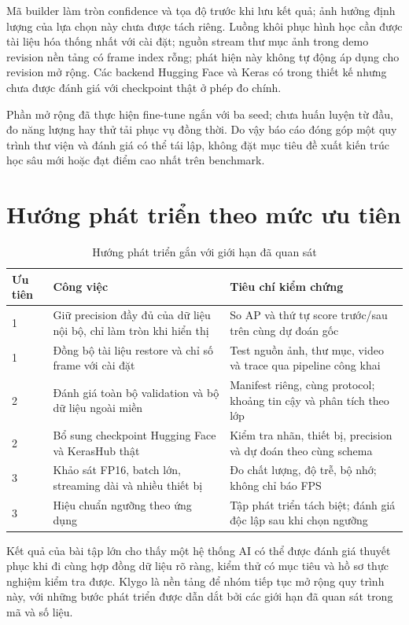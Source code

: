 Mã builder làm tròn confidence và tọa độ trước khi lưu kết quả; ảnh hưởng định lượng của lựa chọn này chưa được tách riêng. Luồng khôi phục hình học cần được tài liệu hóa thống nhất với cài đặt; nguồn stream thư mục ảnh trong demo revision nền tảng có frame index rỗng; phát hiện này không tự động áp dụng cho revision mở rộng. Các backend Hugging Face và Keras có trong thiết kế nhưng chưa được đánh giá với checkpoint thật ở phép đo chính.

Phần mở rộng đã thực hiện fine-tune ngắn với ba seed; chưa huấn luyện từ đầu, đo năng lượng hay thử tải phục vụ đồng thời. Do vậy báo cáo đóng góp một quy trình thư viện và đánh giá có thể tái lập, không đặt mục tiêu đề xuất kiến trúc học sâu mới hoặc đạt điểm cao nhất trên benchmark.

\section{Hướng phát triển theo mức ưu tiên}
\begin{table}[H]\centering\small
\caption{Hướng phát triển gắn với giới hạn đã quan sát}
\begin{tabularx}{\textwidth}{p{1.2cm}YY}
\toprule Ưu tiên & Công việc & Tiêu chí kiểm chứng \\ & Giữ precision đầy đủ của dữ liệu nội bộ, chỉ làm tròn khi hiển thị & So AP và thứ tự score trước/sau trên cùng dự đoán gốc \\
1 & Đồng bộ tài liệu restore và chỉ số frame với cài đặt & Test nguồn ảnh, thư mục, video và trace qua pipeline công khai \\
2 & Đánh giá toàn bộ validation và bộ dữ liệu ngoài miền & Manifest riêng, cùng protocol; khoảng tin cậy và phân tích theo lớp \\
2 & Bổ sung checkpoint Hugging Face và KerasHub thật & Kiểm tra nhãn, thiết bị, precision và dự đoán theo cùng schema \\
3 & Khảo sát FP16, batch lớn, streaming dài và nhiều thiết bị & Đo chất lượng, độ trễ, bộ nhớ; không chỉ báo FPS \\
3 & Hiệu chuẩn ngưỡng theo ứng dụng & Tập phát triển tách biệt; đánh giá độc lập sau khi chọn ngưỡng \\
\bottomrule
\end{tabularx}
\end{table}
Kết quả của bài tập lớn cho thấy một hệ thống AI có thể được đánh giá thuyết phục khi đi cùng hợp đồng dữ liệu rõ ràng, kiểm thử có mục tiêu và hồ sơ thực nghiệm kiểm tra được. Klygo là nền tảng để nhóm tiếp tục mở rộng quy trình này, với những bước phát triển được dẫn dắt bởi các giới hạn đã quan sát trong mã và số liệu.


